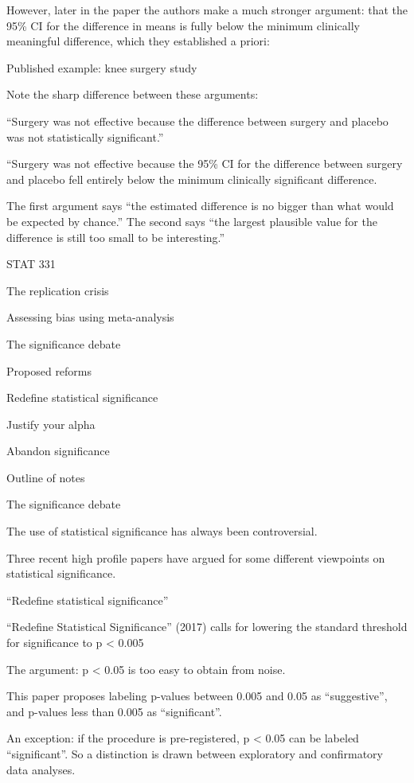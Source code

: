 \documentclass[
  letterpaper,
  DIV=11,
  numbers=noendperiod]{scrreprt}
\begin{document}
However, later in the paper the authors make a much stronger argument:
that the 95\% CI for the difference in means is fully below the minimum
clinically meaningful difference, which they established a priori:

Published example: knee surgery study

Note the sharp difference between these arguments:

``Surgery was not effective because the difference between surgery and
placebo was not statistically significant.''

``Surgery was not effective because the 95\% CI for the difference
between surgery and placebo fell entirely below the minimum clinically
significant difference.

The first argument says ``the estimated difference is no bigger than
what would be expected by chance.'' The second says ``the largest
plausible value for the difference is still too small to be
interesting.''

STAT 331

The replication crisis

Assessing bias using meta-analysis

The significance debate

Proposed reforms

Redefine statistical significance

Justify your alpha

Abandon significance

Outline of notes

The significance debate

The use of statistical significance has always been controversial.

Three recent high profile papers have argued for some different
viewpoints on statistical significance.

``Redefine statistical significance''

``Redefine Statistical Significance'' (2017) calls for lowering the
standard threshold for significance to p \textless{} 0.005

The argument: p \textless{} 0.05 is too easy to obtain from noise.

This paper proposes labeling p-values between 0.005 and 0.05 as
``suggestive'', and p-values less than 0.005 as ``significant''.

An exception: if the procedure is pre-registered, p \textless{} 0.05 can
be labeled ``significant''. So a distinction is drawn between
exploratory and confirmatory data analyses.
\end{document}
